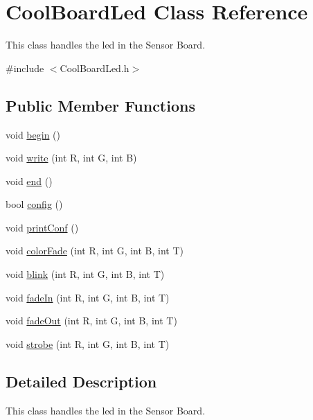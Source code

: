 \hypertarget{class_cool_board_led}{}\section{Cool\+Board\+Led Class Reference}
\label{class_cool_board_led}


This class handles the led in the Sensor Board.  




{\ttfamily \#include $<$Cool\+Board\+Led.\+h$>$}

\subsection*{Public Member Functions}
\begin{DoxyCompactItemize}
\item 
void \hyperlink{class_cool_board_led_ae3cbde8affcc6f011cbd698c8ef911f6}{begin} ()
\item 
void \hyperlink{class_cool_board_led_a30fadd4cbec17ceea428bf7a32207e87}{write} (int R, int G, int B)
\item 
void \hyperlink{class_cool_board_led_a69f323359e0c9f797422f2152b5d41ef}{end} ()
\item 
bool \hyperlink{class_cool_board_led_a1b60e5e30bea96c49ed62ed1bf1ffc8b}{config} ()
\item 
void \hyperlink{class_cool_board_led_a8ed3053a36f0ed4a131f43b5b17efb61}{print\+Conf} ()
\item 
void \hyperlink{class_cool_board_led_a6dbfe23988f43e1242cd05e69b13ff30}{color\+Fade} (int R, int G, int B, int T)
\item 
void \hyperlink{class_cool_board_led_a27706bc029f6a126c55d0b91624ad7fa}{blink} (int R, int G, int B, int T)
\item 
void \hyperlink{class_cool_board_led_aec915442a8441c7cd45c3279d3ff8821}{fade\+In} (int R, int G, int B, int T)
\item 
void \hyperlink{class_cool_board_led_a27c4e14fa2cd3639c0844152cea98887}{fade\+Out} (int R, int G, int B, int T)
\item 
void \hyperlink{class_cool_board_led_adc08c0ac07473499971c503d300f0413}{strobe} (int R, int G, int B, int T)
\end{DoxyCompactItemize}


\subsection{Detailed Description}
This class handles the led in the Sensor Board. 

